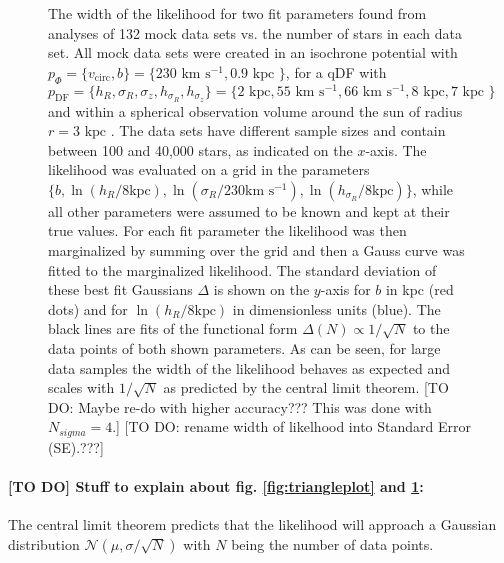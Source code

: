\documentclass[12pt,preprint]{aastex}
\begin{document}


\begin{figure}
\caption{The width of the likelihood for two fit parameters found from analyses of 132 mock data sets vs. the number of stars in each data set. All mock data sets were created in an isochrone potential with $p_\Phi = \{v_\text{circ},b \}=\{230 \text{ km s$^{-1}$},0.9\text{ kpc } \}$, for a qDF with $p_\text{DF} = \{ h_R, \sigma_R, \sigma_z,h_{\sigma_R},h_{\sigma_z}\} =\{2 \text{ kpc}, 55 \text{ km s$^{-1}$}, 66 \text{ km s$^{-1}$}, 8 \text{ kpc}, 7 \text{ kpc }\} $ and within a spherical observation volume around the sun of radius $r = 3 \text{ kpc }$. The data sets have different sample sizes and contain between 100 and 40,000 stars, as indicated on the $x$-axis. The likelihood was evaluated on a grid in the parameters $\{b,\ln(h_R/8\text{kpc}),\ln(\sigma_{R}/230 \text{km s$^{-1}$}),\ln(h_{\sigma_R}/8\text{kpc}) \}$, while all other parameters were assumed to be known and kept at their true values. For each fit parameter the likelihood was then marginalized by summing over the grid and then a Gauss curve was fitted to the marginalized likelihood. The standard deviation of these best fit Gaussians $\Delta$ is shown on the $y$-axis for $b$ in kpc (red dots) and for $\ln(h_R/8\text{kpc})$ in dimensionless units (blue). The black lines are fits of the functional form $\Delta(N) \propto 1/\sqrt{N}$ to the data points  of both shown parameters. As can be seen, for large data samples the width of the likelihood behaves as expected and scales with $1/\sqrt{N}$ as predicted by the central limit theorem.  [TO DO: Maybe re-do with higher accuracy??? This was done with $N_{sigma} = 4$.] [TO DO: rename width of likelhood into Standard Error (SE).???]} 
\label{fig:sqrtN}
\end{figure}

\paragraph{[TO DO] Stuff to explain about fig. \ref{fig:triangleplot} and \ref{fig:sqrtN}:} The central limit theorem predicts that the likelihood will approach a Gaussian distribution $\mathscr{N}(\mu,\sigma/\sqrt{N})$ with $N$ being the number of data points.

\end{document}
